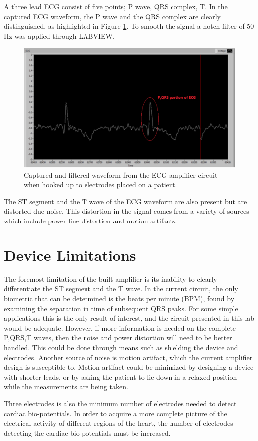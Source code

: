 \documentclass[pdftex,12pt,letterpaper]{article}
\begin{document}
A three lead ECG consist of five points; P wave, QRS complex, T. In the captured ECG waveform, the P wave and the QRS complex are clearly distinguished, as highlighted in Figure \ref{fig:ECG}. To smooth the signal a notch filter of 50 Hz was applied through LABVIEW. 
\begin{figure}[H]
\begin{center}
\includegraphics[scale=.6]{pqrst.png}
\caption{Captured and filtered waveform from the ECG amplifier circuit when hooked up to electrodes placed on a patient.}
\label{fig:ECG}
\end{center}
\end{figure}
The ST segment and the T wave of the ECG waveform are also present but are distorted due noise. This distortion in the signal comes from a variety of sources which include power line distortion and motion artifacts.

\section{Device Limitations}

The foremost limitation of the built amplifier is its inability to clearly differentiate the ST segment and the T wave. In the current circuit, the only biometric that can be determined is the beats per minute (BPM), found by examining the separation in time of subsequent QRS peaks. For some simple applications this is the only result of interest, and the circuit presented in this lab would be adequate. However, if more information is needed on the complete P,QRS,T waves, then the noise and power distortion will need to be better handled. This could be done through means such as shielding the device and electrodes. Another source of noise is motion artifact, which the current amplifier design is susceptible to. Motion artifact could be minimized by designing a device with shorter leads, or by asking the patient to lie down in a relaxed position while the measurements are being taken.

Three electrodes is also the minimum number of electrodes needed to detect cardiac bio-potentials. In order to acquire a more complete picture of the electrical activity of different regions of the heart, the number of electrodes detecting the cardiac bio-potentials must be increased.
\end{document}
